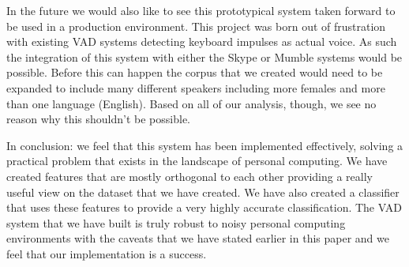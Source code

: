\documentclass[ %
                    author={Sam Phippen},
                supervisor={Dr. Rafal Bogacz},
                     title={Real time voice activity detectors in noisy personal computing environments},
                  subtitle={},
                    degree={MEng},
                      year={2012} ]{thesis}
\begin{document}
In the future we would also like to see this prototypical system taken forward
to be used in a production environment. This project was born out of
frustration with existing VAD systems detecting keyboard impulses as actual
voice. As such the integration of this system with either the Skype or Mumble
systems would be possible. Before this can happen the corpus that we created
would need to be expanded to include many different speakers including more
females and more than one language (English). Based on all of our analysis,
though, we see no reason why this shouldn't be possible.

In conclusion: we feel that this system has been implemented effectively,
solving a practical problem that exists in the landscape of personal computing.
We have created features that are mostly orthogonal to each other providing a
really useful view on the dataset that we have created. We have also created a
classifier that uses these features to provide a very highly accurate
classification. The VAD system that we have built is truly robust to noisy
personal computing environments with the caveats that we have stated earlier in
this paper and we feel that our implementation is a success.


%
%
\end{document}
